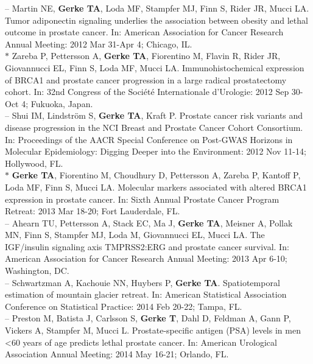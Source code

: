 \documentclass[11pt, a4paper]{article} %
\begin{document}
-- Martin NE, {\bf Gerke TA}, Loda MF, Stampfer MJ, Finn S, Rider JR, Mucci LA. Tumor adiponectin signaling underlies the association between obesity and lethal outcome in prostate cancer. In: American Association for Cancer Research Annual Meeting: 2012 Mar 31-Apr 4; Chicago, IL.\\

$*$ Zareba P, Pettersson A, {\bf Gerke TA}, Fiorentino M, Flavin R, Rider JR, Giovannucci EL, Finn S, Loda MF, Mucci LA. Immunohistochemical expression of BRCA1 and prostate cancer progression in  a large radical prostatectomy cohort. In: 32nd Congress of the Soci\'{e}t\'{e} Internationale d'Urologie: 2012 Sep 30-Oct 4; Fukuoka, Japan.\\

-- Shui IM, Lindstr\"{o}m S, {\bf Gerke TA}, Kraft P. Prostate cancer risk variants and disease progression in the NCI Breast and Prostate Cancer Cohort Consortium. In: Proceedings of the AACR Special Conference on Post-GWAS Horizons in Molecular Epidemiology: Digging Deeper into the Environment: 2012 Nov 11-14; Hollywood, FL.\\

$*$ {\bf Gerke TA}, Fiorentino M, Choudhury D, Pettersson A, Zareba P, Kantoff P, Loda MF, Finn S, Mucci LA. Molecular markers associated with altered BRCA1 expression in prostate cancer. In: Sixth Annual Prostate Cancer Program Retreat: 2013 Mar 18-20; Fort Lauderdale, FL.\\

-- Ahearn TU, Pettersson A, Stack EC, Ma J, {\bf Gerke TA}, Meisner A, Pollak MN, Finn S, Stampfer MJ, Loda M, Giovannucci EL, Mucci LA.  The IGF/insulin signaling axis TMPRSS2:ERG and prostate cancer survival.  In: American Association for Cancer Research Annual Meeting: 2013 Apr 6-10; Washington, DC.\\

-- Schwartzman A, Kachouie NN, Huybers P, {\bf Gerke TA}. Spatiotemporal estimation of mountain glacier retreat. In: American Statistical Association Conference on Statistical Practice: 2014 Feb 20-22; Tampa, FL.\\

-- Preston M, Batista J, Carlsson S, {\bf Gerke T}, Dahl D, Feldman A, Gann P, Vickers A, Stampfer M, Mucci L. Prostate-specific antigen (PSA) levels in men <60 years of age predicts lethal prostate cancer. In: American Urological Association Annual Meeting: 2014 May 16-21; Orlando, FL.\\
\end{document}
